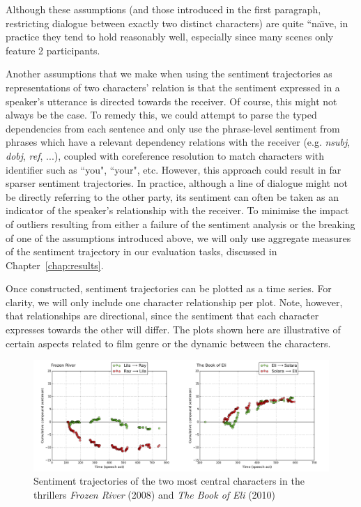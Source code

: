 \documentclass[bsc,frontabs,singlespacing,parskip, twoside]{infthesis}
\begin{document}
Although these assumptions (and those introduced in the first paragraph, restricting dialogue between exactly two distinct characters) are quite “na\"{\i}ve, in practice they tend to hold reasonably well, especially since many scenes only feature 2 participants.

Another assumptions that we make when using the sentiment trajectories as representations of two characters' relation is that the sentiment expressed in a speaker's utterance is directed towards the receiver. Of course, this might not always be the case. To remedy this, we could attempt to parse the typed dependencies from each sentence and only use the phrase-level sentiment from phrases which have a relevant dependency relations with the receiver (e.g. \textit{nsubj}, \textit{dobj}, \textit{ref}, ...), coupled with coreference resolution to match characters with identifier such as ``you", ``your", etc. However, this approach could result in far sparser sentiment trajectories. In practice, although a line of dialogue might not be directly referring to the other party, its sentiment can often be taken as an indicator of the speaker's relationship with the receiver. To minimise the impact of outliers resulting from either a failure of the sentiment analysis or the breaking of one of the assumptions introduced above, we will only use aggregate measures of the sentiment trajectory in our evaluation tasks, discussed in Chapter~\ref{chap:results}.

Once constructed, sentiment trajectories can be plotted as a time series. For clarity, we will only include one character relationship per plot. Note, however, that relationships are directional, since the sentiment that each character expresses towards the other will differ. The plots shown here are illustrative of certain aspects related to film genre or the dynamic between the characters. 

\begin{figure}[h!]
\begin{adjustwidth}{-0.5in}{-0.5in}
	\centering
	\includegraphics[scale=0.43]{figures/y_thrillers}
	\caption{Sentiment trajectories of the two most central characters in the thrillers \textit{Frozen River} (2008) and \textit{The Book of Eli} (2010)}
	\label{fig:thrillers}
\end{adjustwidth}
\end{figure}
\end{document}
